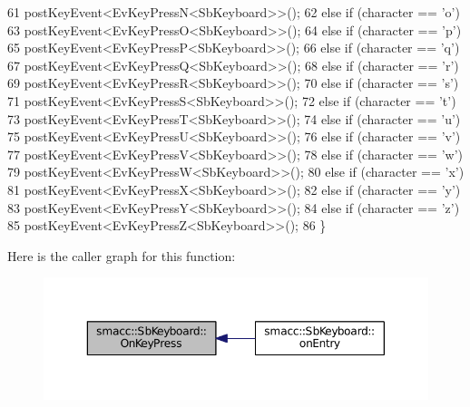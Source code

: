 \begin{DoxyCode}
61                         postKeyEvent<EvKeyPressN<SbKeyboard>>();
62                 \textcolor{keywordflow}{else} \textcolor{keywordflow}{if} (character == \textcolor{charliteral}{'o'})
63                         postKeyEvent<EvKeyPressO<SbKeyboard>>();
64                 \textcolor{keywordflow}{else} \textcolor{keywordflow}{if} (character == \textcolor{charliteral}{'p'})
65                         postKeyEvent<EvKeyPressP<SbKeyboard>>();
66                 \textcolor{keywordflow}{else} \textcolor{keywordflow}{if} (character == \textcolor{charliteral}{'q'})
67                         postKeyEvent<EvKeyPressQ<SbKeyboard>>();
68                 \textcolor{keywordflow}{else} \textcolor{keywordflow}{if} (character == \textcolor{charliteral}{'r'})
69                         postKeyEvent<EvKeyPressR<SbKeyboard>>();
70                 \textcolor{keywordflow}{else} \textcolor{keywordflow}{if} (character == \textcolor{charliteral}{'s'})
71                         postKeyEvent<EvKeyPressS<SbKeyboard>>();
72                 \textcolor{keywordflow}{else} \textcolor{keywordflow}{if} (character == \textcolor{charliteral}{'t'})
73                         postKeyEvent<EvKeyPressT<SbKeyboard>>();
74                 \textcolor{keywordflow}{else} \textcolor{keywordflow}{if} (character == \textcolor{charliteral}{'u'})
75                         postKeyEvent<EvKeyPressU<SbKeyboard>>();
76                 \textcolor{keywordflow}{else} \textcolor{keywordflow}{if} (character == \textcolor{charliteral}{'v'})
77                         postKeyEvent<EvKeyPressV<SbKeyboard>>();
78                 \textcolor{keywordflow}{else} \textcolor{keywordflow}{if} (character == \textcolor{charliteral}{'w'})
79                         postKeyEvent<EvKeyPressW<SbKeyboard>>();
80                 \textcolor{keywordflow}{else} \textcolor{keywordflow}{if} (character == \textcolor{charliteral}{'x'})
81                         postKeyEvent<EvKeyPressX<SbKeyboard>>();
82                 \textcolor{keywordflow}{else} \textcolor{keywordflow}{if} (character == \textcolor{charliteral}{'y'})
83                         postKeyEvent<EvKeyPressY<SbKeyboard>>();
84                 \textcolor{keywordflow}{else} \textcolor{keywordflow}{if} (character == \textcolor{charliteral}{'z'})
85                         postKeyEvent<EvKeyPressZ<SbKeyboard>>();
86         \}
\end{DoxyCode}


Here is the caller graph for this function\+:
\nopagebreak
\begin{figure}[H]
\begin{center}
\leavevmode
\includegraphics[width=350pt]{classsmacc_1_1SbKeyboard_ac0eaa959e1dccf55bd8b2ec5afafe50f_icgraph}
\end{center}
\end{figure}


